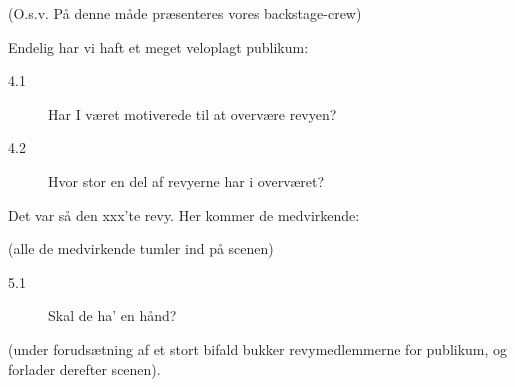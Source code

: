 \documentclass{article}
\begin{document}
\begin{sketch}
(O.s.v. På denne måde præsenteres vores backstage-crew)
         
         Endelig har vi haft et meget veloplagt publikum:

\begin{description}
  \item[4.1] Har I været motiverede til at overvære revyen?
  \item[4.2] Hvor stor en del af revyerne har i overværet?
  \end{description}
  
         Det var så den xxx'te revy. Her kommer de medvirkende:

(alle de medvirkende tumler ind på scenen)
\begin{description}
     
   \item[5.1] Skal de ha' en hånd?
   \end{description}
   
(under forudsætning af et stort bifald bukker revymedlemmerne 
for publikum, og forlader derefter scenen).

  
\end{sketch}
\end{document}
